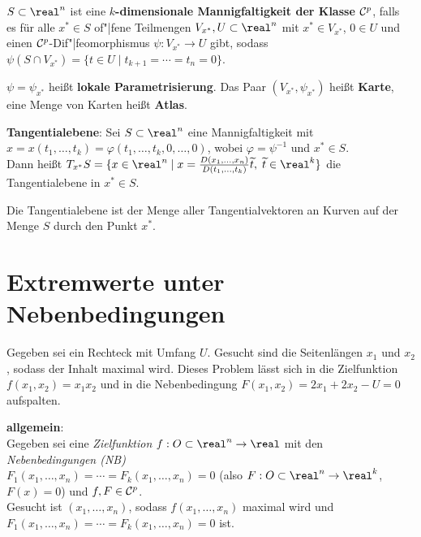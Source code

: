 \linie

$S \subset \real^n$ ist eine
\textbf{$k$-dimensionale Mannigfaltigkeit der Klasse $\mathcal{C}^p$}, falls \\
es für alle $x^\ast \in S$ of"|fene Teilmengen $V_{x^\ast}, U \subset \real^n$
mit $x^\ast \in V_{x^\ast}$, $0 \in U$ und einen $\mathcal{C}^p$-Dif"|feomorphismus
$\psi: V_{x^\ast} \rightarrow U$ gibt, sodass
$\psi(S \cap V_{x^\ast}) = \{t \in U \;|\; t_{k+1} = \dotsb = t_n = 0\}$.

$\psi = \psi_{x^\ast}$ heißt \textbf{lokale Parametrisierung}.
Das Paar $(V_{x^\ast}, \psi_{x^\ast})$ heißt \textbf{Karte}, eine Menge von
Karten heißt \textbf{Atlas}.

\linie

\textbf{Tangentialebene}:
Sei $S \subset \real^n$ eine Mannigfaltigkeit mit \\
$x = x(t_1, \dotsc, t_k) = \varphi(t_1, \dotsc, t_k, 0, \dotsc, 0)$, wobei
$\varphi = \psi^{-1}$ und $x^\ast \in S$. \\
Dann heißt $T_{x^\ast} S = \{x \in \real^n \;|\; x =
\frac{D(x_1, \dotsc, x_n)}{D(t_1, \dotsc, t_k)} \widetilde{t},\;
\widetilde{t} \in \real^k\}$
die Tangentialebene in $x^\ast \in S$.

Die Tangentialebene ist der Menge aller Tangentialvektoren an Kurven
auf der Menge $S$ durch den Punkt $x^\ast$.


\pagebreak

\section{%
    Extremwerte unter Nebenbedingungen%
}

Gegeben sei ein Rechteck mit Umfang $U$.
Gesucht sind die Seitenlängen $x_1$ und $x_2$, sodass der Inhalt maximal wird.
Dieses Problem lässt sich in die Zielfunktion $f(x_1, x_2) = x_1 x_2$ und
in die Nebenbedingung $F(x_1, x_2) = 2x_1 + 2x_2 - U = 0$ aufspalten.

\linie

\textbf{allgemein}: \\
Gegeben sei eine \emph{Zielfunktion} $f: O \subset \real^n \rightarrow \real$
mit den \emph{Nebenbedingungen (NB)} \\
$F_1(x_1, \dotsc, x_n) = \dotsb = F_k(x_1, \dotsc, x_n) = 0$
(also $F: O \subset \real^n \rightarrow \real^k$, $F(x) = 0$)
und $f, F \in \mathcal{C}^p$. \\
Gesucht ist $(x_1, \dotsc, x_n)$, sodass $f(x_1, \dotsc, x_n)$ maximal wird
und \\
$F_1(x_1, \dotsc, x_n) = \dotsb = F_k(x_1, \dotsc, x_n) = 0$ ist.


